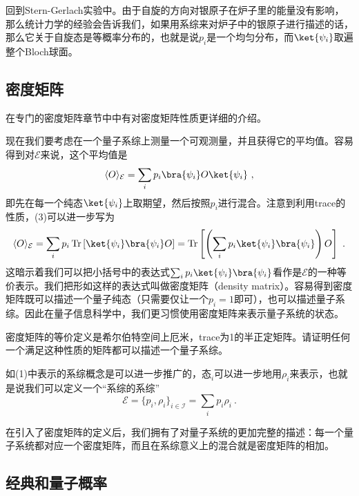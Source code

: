回到Stern-Gerlach实验中。由于自旋的方向对银原子在炉子里的能量没有影响，那么统计力学的经验会告诉我们，如果用系综来对炉子中的银原子进行描述的话，那么它关于自旋态是等概率分布的，也就是说$p_i$是一个均匀分布，而$\ket{\psi_i}$取遍整个Bloch球面。

\subsection{密度矩阵}

在专门的密度矩阵章节中中有对密度矩阵性质更详细的介绍。

现在我们要考虑在一个量子系综上测量一个可观测量，并且获得它的平均值。容易得到对$\mathcal{E}$来说，这个平均值是\begin{equation}
\langle O\rangle_\mathcal{E}=\sum_i p_i\bra{\psi_i}O\ket{\psi_i}~,
\end{equation}
即先在每一个纯态$\ket{\psi_i}$上取期望，然后按照$p_i$进行混合。注意到利用trace的性质，(3)可以进一步写为
\begin{equation}
\langle O\rangle_\mathcal{E}=\sum_i p_i\operatorname{Tr}\left[\ket{\psi_i}\bra{\psi_i}O\right]=\operatorname{Tr}\left[\left(\sum_i p_i\ket{\psi_i}\bra{\psi_i}\right)O\right]~.
\end{equation}
这暗示着我们可以把小括号中的表达式$\sum_i p_i\ket{\psi_i}\bra{\psi_i}$看作是$\mathcal{E}$的一种等价表示。我们把形如这样的表达式叫做密度矩阵（density matrix）。容易得到密度矩阵既可以描述一个量子纯态（只需要仅让一个$p_i=1$即可），也可以描述量子系综。因此在量子信息科学中，我们更习惯使用密度矩阵来表示量子系统的状态。
\begin{exercise}{}
密度矩阵的等价定义是希尔伯特空间上厄米，trace为1的半正定矩阵。请证明任何一个满足这种性质的矩阵都可以描述一个量子系综。
\end{exercise}

如(1)中表示的系综概念是可以进一步推广的，$\text{态}_i$可以进一步地用$\rho_i$来表示，也就是说我们可以定义一个“系综的系综”
\begin{equation}\mathcal{E}=\{p_i,\rho_i\}_{i\in\mathcal{I}}=\sum_i p_i\rho_i~.\end{equation}

在引入了密度矩阵的定义后，我们拥有了对量子系统的更加完整的描述：每一个量子系统都对应一个密度矩阵，而且在系综意义上的混合就是密度矩阵的相加。

\subsection{经典和量子概率}

